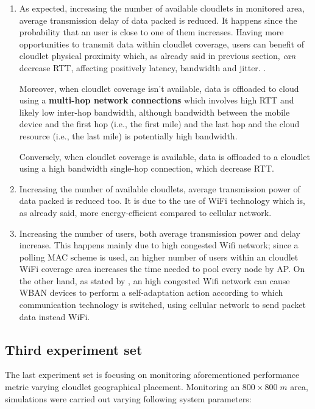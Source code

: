 \documentclass[sigchi]{acmart}
\begin{document}
\begin{enumerate}

\item As expected, increasing the number of available cloudlets in monitored area, average transmission delay of data packed is reduced. It happens since the probability  that an user is close to one of them increases. Having more opportunities to transmit data within cloudlet coverage, users can benefit of cloudlet physical proximity which, as already said in previous section, \textit{can} decrease RTT, affecting positively latency, bandwidth and jitter. \cite{TheEmergenceOfEdgeComputing}. 

Moreover, when cloudlet coverage isn't available, data is offloaded to cloud using a \textbf{multi-hop network connections} which involves high RTT and likely low inter-hop bandwidth, although bandwidth between the mobile device and the first hop (i.e., the first mile) and the last hop and the cloud resource (i.e., the last mile) is potentially high bandwidth.\cite{ArchitecturalTacticsCyberForaging}

Conversely, when cloudlet coverage is available, data is offloaded to a cloudlet using a high bandwidth single-hop connection, which decrease RTT.

\item Increasing the number of available cloudlets, average transmission power of data packed is reduced too. It is due to the use of WiFi technology which is, as already said, more energy-efficient compared to cellular network.

\item Increasing the number of users, both average transmission power and delay increase. This happens mainly due to high congested Wifi network; since a polling MAC scheme is used, an higher number of users within an cloudlet WiFi coverage area increases the time needed to pool every node by AP. On the other hand, as stated by \citep{MSAReport}, an high congested Wifi network can cause WBAN devices to perform a self-adaptation action according to which communication technology is switched, using cellular network to send packet data instead WiFi.

\end{enumerate}

\subsection{Third experiment set}

The last experiment set is focusing on monitoring aforementioned performance metric varying cloudlet geographical placement. Monitoring an $800 \times 800 \; m$ area, simulations were carried out varying following system parameters:
\end{document}
